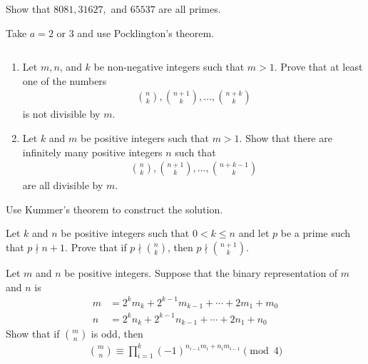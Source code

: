 \documentclass{subfiles}
\begin{document}
	\begin{problem}
		Show that $8081, 31627,$ and $65537$ are all primes.
	\end{problem}
	\begin{hint}
		Take $a=2$ or $3$ and use Pocklington's theorem.
	\end{hint}

	\begin{problem}
		$ $
		\begin{enumerate}
			\item Let $m,n$, and $k$ be non-negative integers such that $m>1$. Prove that at least one of the numbers
				\begin{align*}
					\binom{n}{k}, \binom{n+1}{k}, \ldots,\binom{n+k}{k}
				\end{align*}
			 is not divisible by $m$.
			 \item Let $k$ and $m$ be positive integers such that $m>1$. Show that there are infinitely many positive integers $n$ such that
				 \begin{align*}
					 \binom{n}{k}, \binom{n+1}{k}, \ldots, \binom{n+k-1}{k}
				 \end{align*}
			 are all divisible by $m$.
		\end{enumerate}
	\end{problem}

	\begin{hint}
		Use Kummer's theorem to construct the solution.
	\end{hint}

	\begin{problem}
		Let $k$ and $n$ be positive integers such that $0<k\leq n$ and let $p$ be a prime such that $p \nmid n+1$. Prove that if $p\nmid\binom{n}{k}$, then $p \nmid\binom{n+1}{k}$.
	\end{problem}

	\begin{problem}
		Let $m$ and $n$ be positive integers. Suppose that the binary representation of $m$ and $n$ is
			\begin{align*}
				m   &= 2^km_k+2^{k-1}m_{k-1}+\cdots +2m_1+m_0\\
				n   &= 2^kn_k+2^{k-1}n_{k-1}+\cdots +2n_1+n_0
			\end{align*}
		Show that if $\binom{m}{n}$ is odd, then
			\begin{align*}
				\binom{m}{n} \equiv \prod_{i=1}^{k} (-1)^{n_{i-1}m_i+n_im_{i-1}} \pmod 4
			\end{align*}
	\end{problem}
\end{document}
